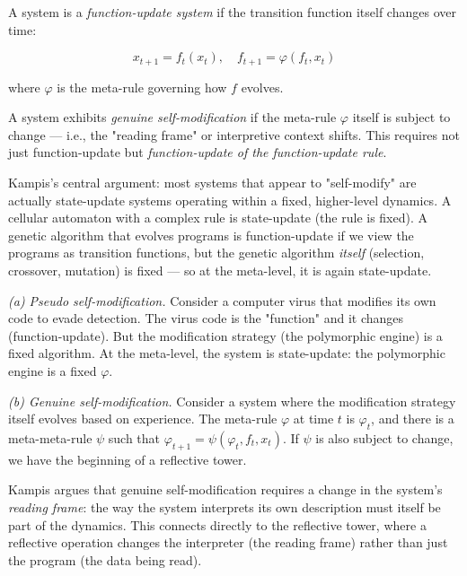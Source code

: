 \begin{definition}
A system is a \textit{function-update system} if the transition function itself changes over time:

\[x_{t+1} = f_t(x_t), \quad f_{t+1} = \varphi(f_t, x_t)\]

where $\varphi$ is the meta-rule governing how $f$ evolves.
\end{definition}

\begin{definition}
A system exhibits \textit{genuine self-modification} if the meta-rule $\varphi$ itself is subject to change --- i.e., the "reading frame" or interpretive context shifts. This requires not just function-update but \textit{function-update of the function-update rule}.

Kampis's central argument: most systems that appear to "self-modify" are actually state-update systems operating within a fixed, higher-level dynamics. A cellular automaton with a complex rule is state-update (the rule is fixed). A genetic algorithm that evolves programs is function-update if we view the programs as transition functions, but the genetic algorithm \textit{itself} (selection, crossover, mutation) is fixed --- so at the meta-level, it is again state-update.
\end{definition}

\begin{example}

\textit{(a) Pseudo self-modification.} Consider a computer virus that modifies its own code to evade detection. The virus code is the "function" and it changes (function-update). But the modification strategy (the polymorphic engine) is a fixed algorithm. At the meta-level, the system is state-update: the polymorphic engine is a fixed $\varphi$.

\textit{(b) Genuine self-modification.} Consider a system where the modification strategy itself evolves based on experience. The meta-rule $\varphi$ at time $t$ is $\varphi_t$, and there is a meta-meta-rule $\psi$ such that $\varphi_{t+1} = \psi(\varphi_t, f_t, x_t)$. If $\psi$ is also subject to change, we have the beginning of a reflective tower.

Kampis argues that genuine self-modification requires a change in the system's \textit{reading frame}: the way the system interprets its own description must itself be part of the dynamics. This connects directly to the reflective tower, where a reflective operation changes the interpreter (the reading frame) rather than just the program (the data being read).
\end{example}

